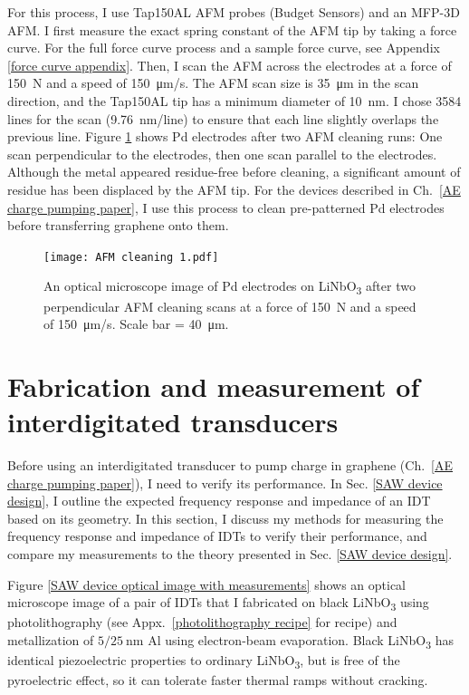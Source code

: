 \documentclass[double,12pt,1in,seploa]{beavtex}
\let\Oldsection\section
\renewcommand{\section}{\FloatBarrier\Oldsection}
\begin{document}
For this process, I use Tap150AL AFM probes (Budget Sensors) and an MFP-3D AFM. I first measure the exact spring constant of the AFM tip by taking a force curve. For the full force curve process and a sample force curve, see Appendix \ref{force curve appendix}. Then, I scan the AFM across the electrodes at a force of \SI{150}{N} and a speed of \SI{150}{\micro\meter/\second}. The AFM scan size is \SI{35}{\micro\meter} in the scan direction, and the Tap150AL tip has a minimum diameter of \SI{10}{\nano\meter}. I chose 3584 lines for the scan (\SI{9.76}{\nano\meter/line}) to ensure that each line slightly overlaps the previous line. Figure \ref{AFM cleaning points} shows Pd electrodes after two AFM cleaning runs: One scan perpendicular to the electrodes, then one scan parallel to the electrodes. Although the metal appeared residue-free before cleaning, a significant amount of residue has been displaced by the AFM tip. For the devices described in Ch.\ \ref{AE charge pumping paper}, I use this process to clean pre-patterned Pd electrodes before transferring graphene onto them.

\begin{figure}
    \texttt{[image: AFM cleaning 1.pdf]}
    \caption{An optical microscope image of Pd electrodes on LiNbO\textsubscript{3} after two perpendicular AFM cleaning scans at a force of \SI{150}{N} and a speed of \SI{150}{\micro\meter/\second}. Scale bar = \SI{40}{\micro\meter}.}
    \label{AFM cleaning points}
\end{figure}


\section{Fabrication and measurement of interdigitated transducers} \label{IDT methods}

Before using an interdigitated transducer to pump charge in graphene (Ch.\ \ref{AE charge pumping paper}), I need to verify its performance. In Sec. \ref{SAW device design}, I outline the expected frequency response and impedance of an IDT based on its geometry. In this section, I discuss my methods for measuring the frequency response and impedance of IDTs to verify their performance, and compare my measurements to the theory presented in Sec. \ref{SAW device design}.

Figure \ref{SAW device optical image with measurements} shows an optical microscope image of a pair of IDTs that I fabricated on black LiNbO\textsubscript{3} using photolithography (see Appx.\ \ref{photolithography recipe} for recipe) and metallization of $5/\SI{25}{\nano\meter}$ Al using electron-beam evaporation. Black LiNbO\textsubscript{3} has identical piezoelectric properties to ordinary LiNbO\textsubscript{3}, but is free of the pyroelectric effect, so it can tolerate faster thermal ramps without cracking.
\end{document}
